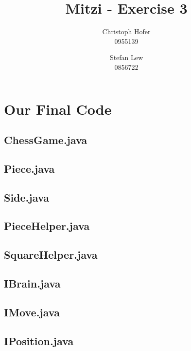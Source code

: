 \documentclass [12pt ,a4paper, english]{scrartcl}
\author{Christoph Hofer\\ 0955139 \and Stefan Lew \\ 0856722}
\title{Mitzi - Exercise 3}
\theoremstyle{plain}
\theoremstyle{definition}
\theoremstyle{remark}
\begin{document}
\maketitle
\newpage
\tableofcontents
\newpage

\section{Our Final Code}

\subsection{ChessGame.java}


\subsection{Piece.java}


\subsection{Side.java}


\subsection{PieceHelper.java}


\subsection{SquareHelper.java}


\subsection{IBrain.java}


\subsection{IMove.java}


\subsection{IPosition.java}

\end{document}
